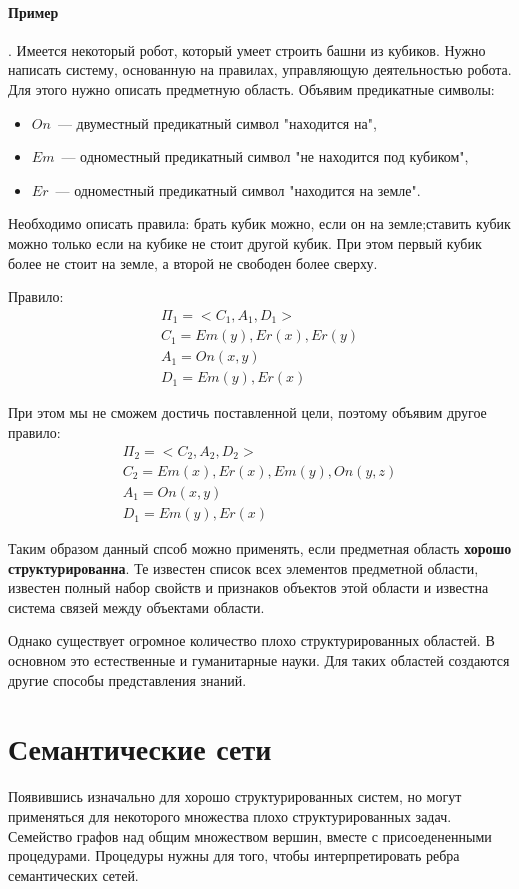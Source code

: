 \paragraph{Пример}. Имеется некоторый робот, который умеет строить башни из кубиков. Нужно написать систему, основанную на правилах, управляющую деятельностью робота. Для этого нужно описать предметную область. Объявим предикатные символы:
\begin{itemize}
	\item $On$~--- двуместный предикатный символ "находится на",
	\item $Em$~--- одноместный предикатный символ "не находится под кубиком",
	\item $Er$~--- одноместный предикатный символ "находится на земле".
\end{itemize}
Необходимо описать правила: брать кубик можно, если он на земле;ставить кубик можно только если на кубике не стоит другой кубик. При этом первый кубик более не стоит на земле, а второй не свободен более сверху.

Правило:
\begin{align*}
	\Pi_1=<C_1,A_1,D_1> \\
	C_1={Em(y),Er(x),Er(y)} \\
	A_1={On(x,y)} \\
	D_1={Em(y), Er(x)}
\end{align*}

При этом мы не сможем достичь поставленной цели, поэтому объявим другое правило:
\begin{align*}
	\Pi_2=<C_2,A_2,D_2> \\
	C_2={Em(x),Er(x),Em(y),On(y,z)} \\
	A_1={On(x,y)} \\
	D_1={Em(y), Er(x)}
\end{align*}

Таким образом данный спсоб можно применять, если предметная область \textbf{хорошо структурированна}. Те известен список всех элементов предметной области, известен полный набор свойств и признаков объектов этой области и известна система связей между объектами области. 

Однако существует огромное количество плохо структурированных областей. В основном это естественные и гуманитарные науки. Для таких областей создаются другие способы представления знаний.

\section{Семантические сети}
Появившись изначально для хорошо структурированных систем, но могут применяться для некоторого множества плохо структурированных задач. Семейство графов над общим множеством вершин, вместе с присоедененными процедурами. Процедуры нужны для того, чтобы интерпретировать ребра семантических сетей.

